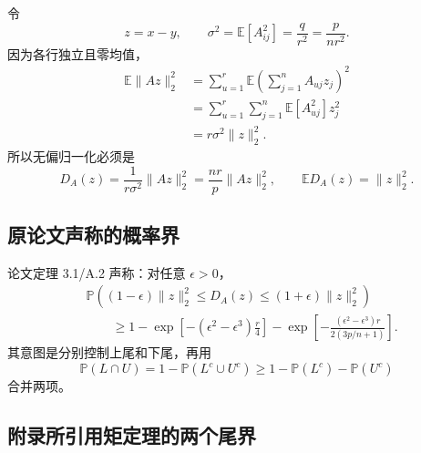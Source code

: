 \documentclass[11pt]{article}
\numberwithin{equation}{section}
\newcommand{\E}{\mathbb{E}}
\newcommand{\Pp}{\mathbb{P}}
\newcommand{\1}{\mathbf{1}}
\begin{document}
令
\begin{equation}
  z=x-y,
  \qquad
  \sigma^2=\E[A_{ij}^2]=\frac{q}{r^2}=\frac{p}{nr^2}.
  \label{eq:sigma}
\end{equation}
因为各行独立且零均值，
\begin{align}
  \E\|Az\|_2^2
  &=\sum_{u=1}^{r}\E\left(\sum_{j=1}^{n}A_{uj}z_j\right)^2\\
  &=\sum_{u=1}^{r}\sum_{j=1}^{n}\E[A_{uj}^2]z_j^2\\
  &=r\sigma^2\|z\|_2^2.
\end{align}
所以无偏归一化必须是
\begin{equation}
  D_A(z)=\frac{1}{r\sigma^2}\|Az\|_2^2
  =\frac{nr}{p}\|Az\|_2^2,
  \qquad
  \E D_A(z)=\|z\|_2^2.
  \label{eq:normalized-distance}
\end{equation}

\subsection{原论文声称的概率界}

论文定理 3.1/A.2 声称：对任意 $\epsilon>0$，
\begin{align}
 &\Pp\left(
 (1-\epsilon)\|z\|_2^2
 \le D_A(z)
 \le(1+\epsilon)\|z\|_2^2
 \right)\nonumber\\
 &\qquad\ge
 1-\exp\!\left[-(\epsilon^2-\epsilon^3)\frac r4\right]
 -\exp\!\left[
 -\frac{(\epsilon^2-\epsilon^3)r}{2(3p/n+1)}
 \right].
 \label{eq:paper-jl-claim}
\end{align}
其意图是分别控制上尾和下尾，再用
\begin{equation}
  \Pp(L\cap U)
  =1-\Pp(L^c\cup U^c)
  \ge 1-\Pp(L^c)-\Pp(U^c)
\end{equation}
合并两项。

\subsection{附录所引用矩定理的两个尾界}
\end{document}
